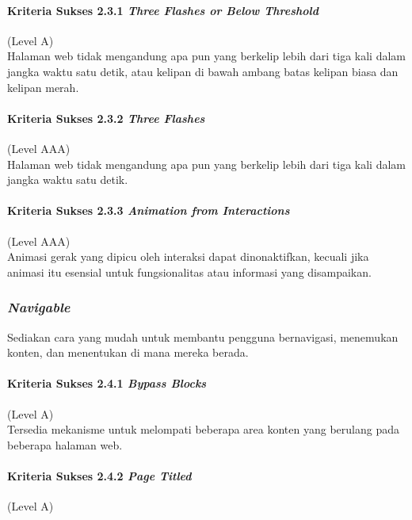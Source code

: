 \documentclass[a4paper,twoside]{article}
\begin{document}
\begin{enumerate}
		\paragraph{Kriteria Sukses 2.3.1 \textit{Three Flashes or Below Threshold}}
		\label{sec:kriteria_sukses_2.3.1}
		(Level A)\\

		Halaman web tidak mengandung apa pun yang berkelip lebih dari tiga kali dalam jangka waktu satu detik, atau kelipan di bawah ambang batas kelipan biasa dan kelipan merah.

		\paragraph{Kriteria Sukses 2.3.2 \textit{Three Flashes}}
		\label{sec:kriteria_sukses_2.3.2}
		(Level AAA)\\

		Halaman web tidak mengandung apa pun yang berkelip lebih dari tiga kali dalam jangka waktu satu detik.

		\paragraph{Kriteria Sukses 2.3.3 \textit{Animation from Interactions}}
		\label{sec:kriteria_sukses_2.3.3}
		(Level AAA)\\

		Animasi gerak yang dipicu oleh interaksi dapat dinonaktifkan, kecuali jika animasi itu esensial untuk fungsionalitas atau informasi yang disampaikan.

		\subsubsection*{\textit{Navigable}}
		\label{sec:navigable}
		Sediakan cara yang mudah untuk membantu pengguna bernavigasi, menemukan konten, dan menentukan di mana mereka berada.

		\paragraph{Kriteria Sukses 2.4.1 \textit{Bypass Blocks}}
		\label{sec:kriteria_sukses_2.4.1}
		(Level A)\\

		Tersedia mekanisme untuk melompati beberapa area konten yang berulang pada beberapa halaman web.

		\paragraph{Kriteria Sukses 2.4.2 \textit{Page Titled}}
		\label{sec:kriteria_sukses_2.4.2}
		(Level A)\\


\end{enumerate}
\end{document}

